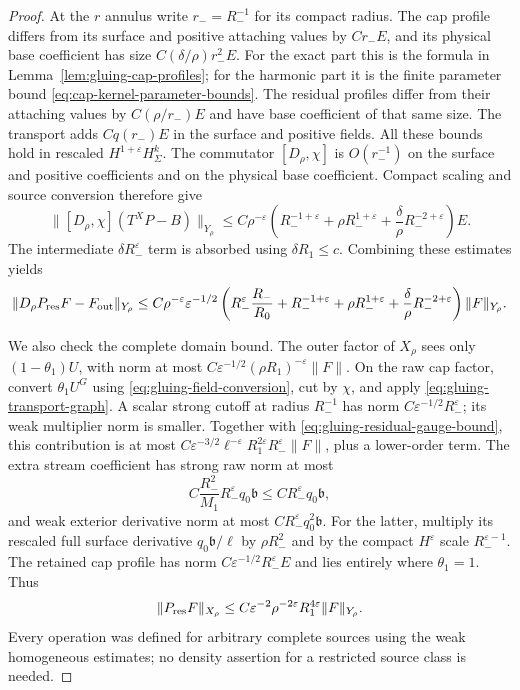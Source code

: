 \documentclass[11pt]{amsart}
\theoremstyle{definition}
\theoremstyle{remark}
\theoremstyle{plain}
\begin{document}
\begin{proof}
At the $r$ annulus write $r_-=R_-^{-1}$ for its compact radius.
The cap profile differs from its surface and positive attaching
values by $Cr_-E$, and its physical base coefficient has size
$C(\delta/\rho)r_-^2E$. For the exact part this is the formula
in Lemma~\ref{lem:gluing-cap-profiles}; for the harmonic part it
is the finite parameter bound \eqref{eq:cap-kernel-parameter-bounds}.
The residual profiles differ from their attaching values by
$C(\rho/r_-)E$ and have base coefficient of that same size.
The transport adds $Cq(r_-)E$ in the surface and positive fields.
All these bounds hold in rescaled $H^{1+\varepsilon}H^k_\Sigma$.
The commutator $[D_\rho,\chi]$ is $O(r_-^{-1})$ on the
surface and positive coefficients and on the physical base coefficient.
Compact scaling and source conversion therefore give
\[
 \|[D_\rho,\chi](T^XP-B)\|_{Y_\rho}
 \leq C\rho^{-\varepsilon}
       \left(R_-^{-1+\varepsilon}+\rho R_-^{1+\varepsilon}
                    +\frac\delta\rho R_-^{-2+\varepsilon}\right)E.
\]
The intermediate $\delta R_-^\varepsilon$ term is absorbed
using $\delta R_1\leq c$. Combining these estimates yields
\begin{equation}\label{eq:gluing-residual-block-error}
 \begin{split}
 \|D_\rho P_{\rm res}F-F_{\rm out}\|_{Y_\rho}
 \leq C\rho^{-\varepsilon}\varepsilon^{-1/2}
 \left(R_-^\varepsilon\frac{R_-}{R_0}+R_-^{-1+\varepsilon}
       +\rho R_-^{1+\varepsilon}
       +\frac\delta\rho R_-^{-2+\varepsilon}\right)\|F\|_{Y_\rho}.
 \end{split}
\end{equation}

We also check the complete domain bound. The outer factor of $X_\rho$
sees only $(1-\theta_1)U$, with norm at most
$C\varepsilon^{-1/2}(\rho R_1)^{-\varepsilon}\|F\|$.
On the raw cap factor, convert $\theta_1U^G$ using
\eqref{eq:gluing-field-conversion}, cut by $\chi$, and apply
\eqref{eq:gluing-transport-graph}. A scalar strong cutoff at
radius $R_-^{-1}$ has norm $C\varepsilon^{-1/2}R_-^\varepsilon$;
its weak multiplier norm is smaller. Together with
\eqref{eq:gluing-residual-gauge-bound}, this contribution is at
most $C\varepsilon^{-3/2}\ell^{-\varepsilon}
R_1^{2\varepsilon}R_-^\varepsilon\|F\|$, plus a lower-order term.
The extra stream coefficient has strong raw norm at most
\[
 C\frac{R_-^2}{M_1}R_-^\varepsilon q_0\mathfrak b
                      \leq CR_-^\varepsilon q_0\mathfrak b,
\]
and weak exterior derivative norm at most
$CR_-^\varepsilon q_0^2\mathfrak b$.
For the latter, multiply its rescaled full surface derivative
$q_0\mathfrak b/\ell$ by $\rho R_-^2$ and by the compact
$H^\varepsilon$ scale $R_-^{\varepsilon-1}$.
The retained cap profile has norm
$C\varepsilon^{-1/2}R_-^\varepsilon E$ and lies entirely
where $\theta_1=1$. Thus
\begin{equation}\label{eq:gluing-parametrix-bound}
 \|P_{\rm res}F\|_{X_\rho}
       \leq C\varepsilon^{-2}\rho^{-2\varepsilon}R_1^{4\varepsilon}
                                                       \|F\|_{Y_\rho}.
\end{equation}
Every operation was defined for arbitrary complete sources using the
weak homogeneous estimates; no density assertion for a restricted
source class is needed.


\end{proof}
\end{document}
